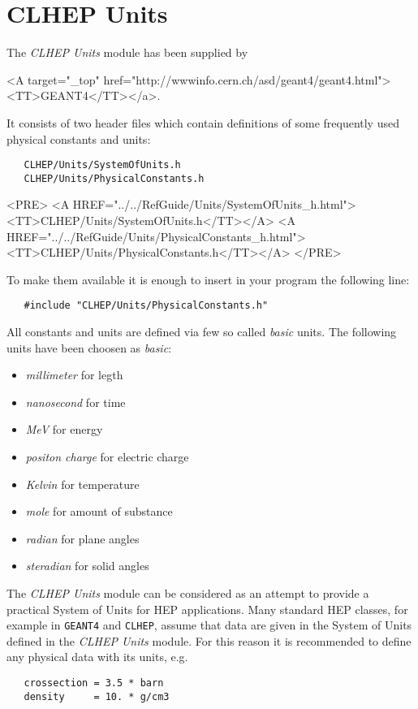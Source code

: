 \documentclass{article}
\begin{document}
\section*{CLHEP Units}

The {\it CLHEP Units} module has been supplied by 
\begin{rawhtml}
<A target="_top" href="http://wwwinfo.cern.ch/asd/geant4/geant4.html">
<TT>GEANT4</TT></a>.
\end{rawhtml}
It consists of two header files which contain definitions of some frequently
used physical constants and units:
\begin{latexonly}
\begin{verbatim}
   CLHEP/Units/SystemOfUnits.h
   CLHEP/Units/PhysicalConstants.h
\end{verbatim}
\end{latexonly}
\begin{rawhtml}
<PRE>
   <A HREF="../../RefGuide/Units/SystemOfUnits_h.html"><TT>CLHEP/Units/SystemOfUnits.h</TT></A>
   <A HREF="../../RefGuide/Units/PhysicalConstants_h.html"><TT>CLHEP/Units/PhysicalConstants.h</TT></A>
</PRE>
\end{rawhtml}

To make them available it is enough to insert in your program the following
line:
\begin{verbatim}
   #include "CLHEP/Units/PhysicalConstants.h"
\end{verbatim}

All constants and units are defined via few so called {\it basic} units.
The following units have been choosen as {\it basic}:
\begin{itemize}
\item {\it millimeter} for legth
\item {\it nanosecond} for time
\item {\it MeV} for energy
\item {\it positon charge} for electric charge
\item {\it Kelvin} for temperature
\item {\it mole} for amount of substance 
\item {\it radian} for plane angles
\item {\it steradian} for solid angles
\end{itemize}

The {\it CLHEP Units} module can be considered as an attempt to provide
a practical System of Units for HEP applications.
Many standard HEP classes, for example in {\tt GEANT4} and {\tt CLHEP},
assume that data are given in the System of Units defined in the
{\it CLHEP Units} module. For this reason it is recommended to define any
physical data with its units, e.g.
\begin{verbatim}
   crossection = 3.5 * barn
   density     = 10. * g/cm3
\end{verbatim}
\end{document}
